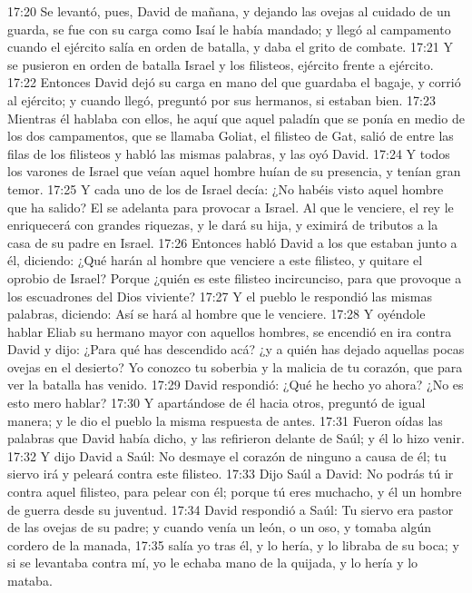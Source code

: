 17:20 Se levantó, pues, David de mañana, y dejando las ovejas al cuidado de un guarda, se fue con su carga como Isaí le había mandado; y llegó al campamento cuando el ejército salía en orden de batalla, y daba el grito de combate.  
17:21 Y se pusieron en orden de batalla Israel y los filisteos, ejército frente a ejército.  
17:22 Entonces David dejó su carga en mano del que guardaba el bagaje, y corrió al ejército; y cuando llegó, preguntó por sus hermanos, si estaban bien.  
17:23 Mientras él hablaba con ellos, he aquí que aquel paladín que se ponía en medio de los dos campamentos, que se llamaba Goliat, el filisteo de Gat, salió de entre las filas de los filisteos y habló las mismas palabras, y las oyó David.  
17:24 Y todos los varones de Israel que veían aquel hombre huían de su presencia, y tenían gran temor.  
17:25 Y cada uno de los de Israel decía: ¿No habéis visto aquel hombre que ha salido? El se adelanta para provocar a Israel. Al que le venciere, el rey le enriquecerá con grandes riquezas, y le dará su hija, y eximirá de tributos a la casa de su padre en Israel.  
17:26 Entonces habló David a los que estaban junto a él, diciendo: ¿Qué harán al hombre que venciere a este filisteo, y quitare el oprobio de Israel? Porque ¿quién es este filisteo incircunciso, para que provoque a los escuadrones del Dios viviente? 
17:27 Y el pueblo le respondió las mismas palabras, diciendo: Así se hará al hombre que le venciere.  
17:28 Y oyéndole hablar Eliab su hermano mayor con aquellos hombres, se encendió en ira contra David y dijo: ¿Para qué has descendido acá? ¿y a quién has dejado aquellas pocas ovejas en el desierto? Yo conozco tu soberbia y la malicia de tu corazón, que para ver la batalla has venido.  
17:29 David respondió: ¿Qué he hecho yo ahora? ¿No es esto mero hablar?  
17:30 Y apartándose de él hacia otros, preguntó de igual manera; y le dio el pueblo la misma respuesta de antes.  
17:31 Fueron oídas las palabras que David había dicho, y las refirieron delante de Saúl; y él lo hizo venir.  
17:32 Y dijo David a Saúl: No desmaye el corazón de ninguno a causa de él; tu siervo irá y peleará contra este filisteo.  
17:33 Dijo Saúl a David: No podrás tú ir contra aquel filisteo, para pelear con él; porque tú eres muchacho, y él un hombre de guerra desde su juventud.  
17:34 David respondió a Saúl: Tu siervo era pastor de las ovejas de su padre; y cuando venía un león, o un oso, y tomaba algún cordero de la manada,  
17:35 salía yo tras él, y lo hería, y lo libraba de su boca; y si se levantaba contra mí, yo le echaba mano de la quijada, y lo hería y lo mataba.  
